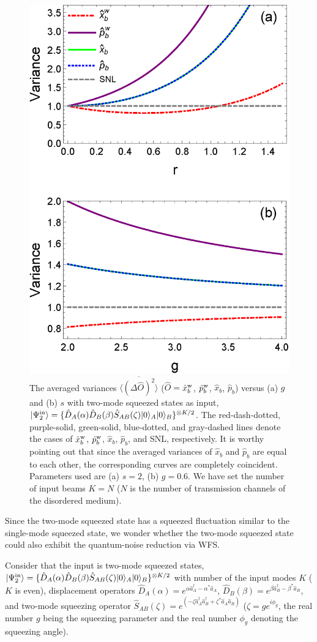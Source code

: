 \documentclass[9pt,twocolumn,twoside]{osajnl}
\begin{document}
\begin{figure}[htb]
\begin{center}
\includegraphics[width=.40\textwidth]{sqz2a20190830.eps} {}
\end{center}
\caption{The averaged variances $\overline{\langle (\Delta \hat{O})^2 \rangle}$ ($\hat{O} =$$\hat{x}_b^{\rm{w}}$, $\hat{p}_b^{\rm{w}}$, $\hat{x}_b$, $\hat{p}_b$) versus (a) $g$ and (b) $s$ with two-mode squeezed states as input, $| \Psi_2^{\rm{in}} \rangle = \{\hat{D}_{A}(\alpha) \hat{D}_{B}(\beta) \hat{S}_{AB}(\zeta) |0\rangle_A |0\rangle_B \}^{\otimes K/2}$. The red-dash-dotted, purple-solid, green-solid, blue-dotted, and gray-dashed lines denote the cases of $\hat{x}_b^{\rm{w}}$, $\hat{p}_b^{\rm{w}}$, $\hat{x}_b$, $\hat{p}_b$, and SNL, respectively. It is worthy pointing out that since the averaged variances of $\hat{x}_b$ and $\hat{p}_b$ are equal to each other, the corresponding curves are completely coincident. Parameters used are (a) $s = 2$, (b) $g = 0.6$. We have set the number of input beams $K=N$ ($N$ is the number of transmission channels of the disordered medium). }
\label{xr2}
\end{figure}


Since the two-mode squeezed state \cite{barnett2002} has a squeezed fluctuation similar to the single-mode squeezed state, we wonder whether the two-mode squeezed state  could also exhibit the quantum-noise reduction via WFS. 


Consider that the input is two-mode squeezed states, $| \Psi_2^{\rm{in}} \rangle = \{\hat{D}_{A}(\alpha) \hat{D}_{B}(\beta) \hat{S}_{AB}(\zeta) |0\rangle_A |0\rangle_B \}^{\otimes K/2}$ with number of the input modes $K$ ($K$ is even), displacement operators $\hat{D}_A(\alpha) = e^{\alpha \hat{a}_A^{\dagger} - \alpha^{\ast} \hat{a}_A}$, $\hat{D}_B(\beta) = e^{\beta \hat{a}_B^{\dagger} - \beta^{\ast} \hat{a}_B}$, and two-mode squeezing operator $\hat{S}_{AB}(\zeta) = e^{(-\zeta\hat{a}_{A}^{\dagger}\hat{a}_{B}^{\dagger} +\zeta^{\ast} \hat{a}_{A}\hat{a}_{B}) }$ ($\zeta = g e^{i \phi_{g}}$, the real number $g$ being the squeezing parameter and the real number $\phi_{g}$ denoting the squeezing angle).
\end{document}

